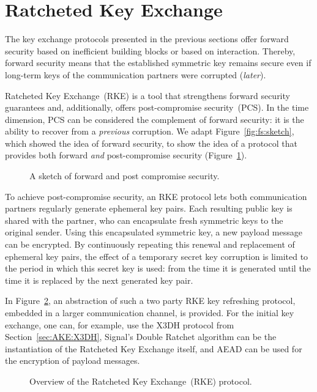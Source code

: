 \section{Ratcheted Key Exchange}
\label{sec:rke}

The key exchange protocols presented in the previous sections offer forward security based on inefficient building blocks or based on interaction.
Thereby, forward security means that the established symmetric key remains secure even if long-term keys of the communication partners were corrupted (\emph{later}).

Ratcheted Key Exchange~(RKE) is a tool that strengthens forward security guarantees and, additionally, offers
post-compromise security~(PCS).
In the time dimension, PCS can be considered the complement of forward security:
it is the ability to recover from a \emph{previous} corruption.
We adapt Figure~\ref{fig:fs:sketch}, which showed the idea of forward security, to show the idea of a protocol that provides both forward \emph{and} post-compromise security (Figure~\ref{fig:rke:pcs_fs_overview}).

\begin{figure}[!ht]
    \centering
    
    \caption{A sketch of forward and post compromise security.}
    \label{fig:rke:pcs_fs_overview}
\end{figure}

To achieve post-compromise security, an RKE protocol lets both communication partners regularly generate ephemeral key pairs.
Each resulting public key is shared with the partner, who can encapsulate fresh symmetric keys to the original sender.
Using this encapsulated symmetric key, a new payload message can be encrypted.
By continuously repeating this renewal and replacement of ephemeral key pairs, the effect of a temporary secret key corruption is limited to the period in which this secret key is used:
from the time it is generated until the time it is replaced by the next generated key pair.

In Figure~\ref{fig:rke:overview}, an abstraction of such a two party RKE key refreshing protocol, embedded in a larger communication channel, is provided.
For the initial key exchange, one can, for example, use the X3DH protocol from Section~\ref{sec:AKE:X3DH}, Signal's Double Ratchet algorithm can be the instantiation of the Ratcheted Key Exchange itself, and AEAD can be used for the encryption of payload messages.

\begin{figure}[!ht]
    \centering
    
    \caption{Overview of the Ratcheted Key Exchange~(RKE) protocol.}
    \label{fig:rke:overview}
\end{figure}

